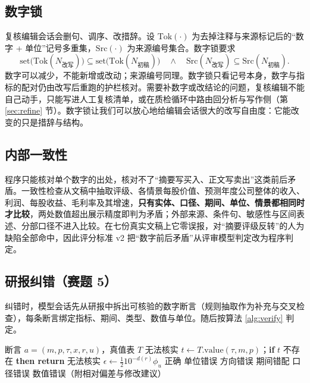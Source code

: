 \subsection{数字锁}
\label{sec:numlock}
复核编辑会话会删句、调序、改措辞。设 $\mathrm{Tok}(\cdot)$ 为去掉注释与来源标记后的“数字 + 单位”记号多重集，$\mathrm{Src}(\cdot)$ 为来源编号集合。数字锁要求
\begin{equation}
  \mathrm{set}\bigl(\mathrm{Tok}(N_{\text{改写}})\bigr)\subseteq \mathrm{set}\bigl(\mathrm{Tok}(N_{\text{初稿}})\bigr)\quad\wedge\quad \mathrm{Src}(N_{\text{改写}})\subseteq \mathrm{Src}(N_{\text{初稿}}).
\end{equation}
数字可以减少，不能新增或改动；来源编号同理。数字锁只看记号本身，数字与指标的配对仍由改写后重跑的护栏核对。需要补数字或改结论的问题，复核编辑不能自己动手，只能写进人工复核清单，或在质检循环中路由回分析与写作侧（第 \ref{sec:refine} 节）。数字锁让我们可以放心地给编辑会话很大的改写自由度：它能改变的只是措辞与结构。

\subsection{内部一致性}
程序只能核对单个数字的出处，核对不了“摘要写买入、正文写卖出”这类前后矛盾。一致性检查从文稿中抽取评级、各情景每股价值、预测年度公司整体的收入、利润、每股收益、毛利率及其增速，\textbf{只有实体、口径、期间、单位、情景都相同时才比较}，两处数值超出展示精度即判为矛盾；外部来源、条件句、敏感性与区间表述、分部口径不进入比较。在七份真实文稿上它零误报，对“摘要评级反转”的人为缺陷全部命中，因此评分标准 v2 把“数字前后矛盾”从评审模型判定改为程序判定。

\subsection{研报纠错（赛题 5）}
\label{sec:check}
纠错时，模型会话先从研报中拆出可核验的数字断言（规则抽取作为补充与交叉检查），每条断言绑定指标、期间、类型、数值与单位。随后按算法 \ref{alg:verify} 判定。

\begin{algorithm}[t]
\caption{断言核查与错误类型诊断（）}
\label{alg:verify}
\small
\begin{algorithmic}[1]
\Require 断言 $a=(m,p,\tau,x,r,u)$，真值表 $T$
 \Return 无法核实 \EndIf
\State $t\gets T.\mathrm{value}(\tau,m,p)$；\textbf{if} $t$ 不存在 \textbf{then return} 无法核实
\State $\epsilon\gets \tfrac12 10^{-d(r)}\phi_u$ 
 \Return 正确 \EndIf
{} \Return 单位错误 \EndIf
{} \Return 方向错误 \EndIf
{} \Return 期间错配 \EndIf
{} \Return 口径错误 \EndIf
\State \Return 数值错误（附相对偏差与修改建议）
\end{algorithmic}
\end{algorithm}


